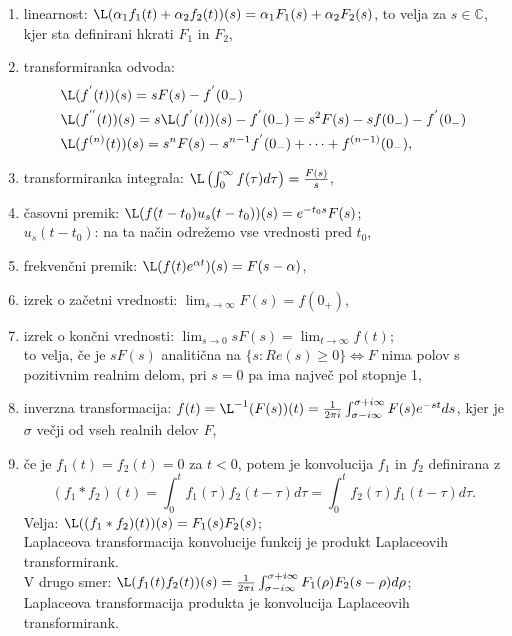 \documentclass[a4paper, 12pt]{book}
\theoremstyle{definition}
\theoremstyle{remark}
\newcommand{\C}{\mathbb{C}}
\begin{document}
\begin{enumerate}
    \item linearnost: $\L(\alpha_1 f_1(t) + \alpha_2 f_2(t))(s) = \alpha_1 F_1(s) + \alpha_2 F_2(s)$,
        to velja za $s \in \C$, kjer sta definirani hkrati $F_1$ in $F_2$,
    \item transformiranka odvoda:
        \begin{align*}
            &\L(f^{'}(t))(s) = s F(s) - f^{'}(0_-) \\
            &\L(f^{''}(t))(s) = s \L(f^{'}(t))(s) - f^{'}(0_-) = s^2 F(s) - s f(0_-) - f^{'}(0_-) \\
            &\L(f^{(n)}(t))(s) = s^n F(s) - s^{n-1} f^{'}(0_-) + \dots + f^{(n-1)}(0_-),
        \end{align*}
    \item transformiranka integrala: $\L\left(\int_0^{\infty} f(\tau) d\tau\right) = \frac{F(s)}{s}$,
    \item časovni premik: $\L(f(t-t_0) u_s(t-t_0))(s) = e^{-t_0 s} F(s)$; \\
        $u_s(t-t_0)$: na ta način odrežemo vse vrednosti pred $t_0$,
    \item frekvenčni premik: $\L(f(t) e^{\alpha t})(s) = F(s-\alpha)$,
    \item izrek o začetni vrednosti: $\lim_{s \to \infty} F(s) = f(0_+)$,
    \item izrek o končni vrednosti: $\lim_{s \to 0} s F(s) = \lim_{t \to \infty} f(t)$; \\
        to velja, če je $s F(s)$ analitična na $\{s: Re(s) \geq 0\} \iff F$
        nima polov s pozitivnim realnim delom, pri $s=0$ pa ima največ pol stopnje 1,
    \item inverzna transformacija: $f(t) = \L^{-1}(F(s))(t) =
        \frac{1}{2 \pi i} \int_{\sigma - i \infty}^{\sigma + i \infty} F(s) e^{-st} ds$,
        kjer je $\sigma$ večji od vseh realnih delov $F$,
    \item če je $f_1(t) = f_2(t) = 0$ za $t < 0$, potem je konvolucija $f_1$ in $f_2$ definirana z
        \begin{equation*}
            (f_1 * f_2)(t) = \int_0^t f_1(\tau) f_2(t-\tau) d\tau = \int_0^t f_2(\tau) f_1(t-\tau) d\tau.
        \end{equation*}
        Velja: $\L((f_1 * f_2)(t))(s) = F_1(s) F_2(s)$; \\
        Laplaceova transformacija konvolucije funkcij je produkt Laplaceovih transformirank. \\
        V drugo smer: $\L(f_1(t) f_2(t))(s) = \frac{1}{2 \pi i} \int_{\sigma - i \infty}^{\sigma + i \infty}
        F_1(\rho) F_2(s - \rho) d\rho$; \\
        Laplaceova transformacija produkta je konvolucija Laplaceovih transformirank.
\end{enumerate}
\end{document}
